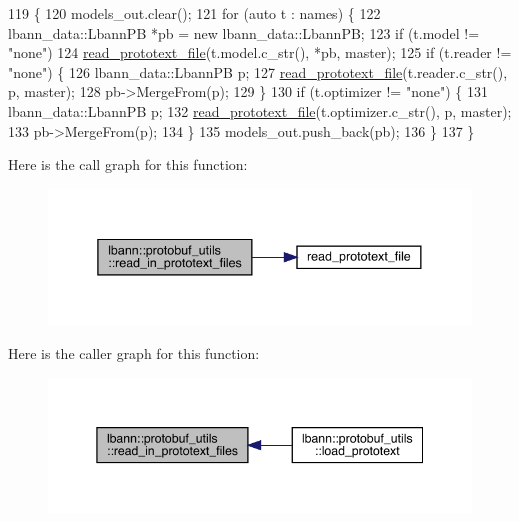 \begin{DoxyCode}
119                                                            \{
120   models\_out.clear();
121   \textcolor{keywordflow}{for} (\textcolor{keyword}{auto} t : names) \{
122     lbann\_data::LbannPB *pb = \textcolor{keyword}{new} lbann\_data::LbannPB;
123     \textcolor{keywordflow}{if} (t.model != \textcolor{stringliteral}{"none"})
124       \hyperlink{proto__common_8cpp_addbf693bd6d4a399daa599ba03509569}{read\_prototext\_file}(t.model.c\_str(), *pb, master);
125     \textcolor{keywordflow}{if} (t.reader != \textcolor{stringliteral}{"none"}) \{
126       lbann\_data::LbannPB p;
127       \hyperlink{proto__common_8cpp_addbf693bd6d4a399daa599ba03509569}{read\_prototext\_file}(t.reader.c\_str(), p, master);
128       pb->MergeFrom(p);
129     \}
130     \textcolor{keywordflow}{if} (t.optimizer != \textcolor{stringliteral}{"none"}) \{
131       lbann\_data::LbannPB p;
132       \hyperlink{proto__common_8cpp_addbf693bd6d4a399daa599ba03509569}{read\_prototext\_file}(t.optimizer.c\_str(), p, master);
133       pb->MergeFrom(p);
134     \}
135     models\_out.push\_back(pb);
136   \}
137 \}
\end{DoxyCode}
Here is the call graph for this function\+:\nopagebreak
\begin{figure}[H]
\begin{center}
\leavevmode
\includegraphics[width=338pt]{classlbann_1_1protobuf__utils_ab8470c35e353af71b04e1e853b99f8ae_cgraph}
\end{center}
\end{figure}
Here is the caller graph for this function\+:\nopagebreak
\begin{figure}[H]
\begin{center}
\leavevmode
\includegraphics[width=345pt]{classlbann_1_1protobuf__utils_ab8470c35e353af71b04e1e853b99f8ae_icgraph}
\end{center}
\end{figure}
\mbox{\label{classlbann_1_1protobuf__utils_a058d524e15fb811e0d193ffb308c5faf}} 
